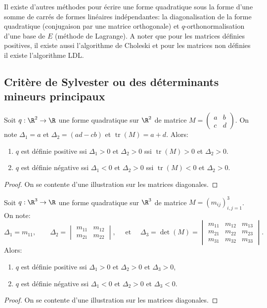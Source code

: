 \sld{\vfill\pagebreak[5]}%
\begin{remark}
	Il existe d'autres méthodes pour écrire une forme quadratique sous la forme d'une somme de carrés de formes linéaires indépendantes: la diagonalisation de la forme quadratique (conjugaison par une matrice orthogonale) et $q$-orthonormalisation d'une base de $E$ (méthode de Lagrange). A noter que pour les matrices définies positives, il existe aussi l'algorithme de Choleski et pour les matrices non définies il existe l'algorithme LDL.
\end{remark}

\sld{\vfill\pagebreak[5]}%
\subsection{Critère de Sylvester ou des déterminants mineurs principaux}


\begin{proposition}
	Soit $q: \R^2 \to \R$ une forme quadratique sur $\R^2$	de matrice $M = \begin{pmatrix}
		a & b \\ c & d
	\end{pmatrix}$. On note $\Delta_1 = a$ et $\Delta_2 =(ad - cb)$ et $\operatorname{tr}(M) = a +d$. Alors:
	\begin{enumerate}
		\item $q$ est définie positive ssi $\Delta_1>0$ et $ \Delta_2 >0$ ssi  $\operatorname{tr}(M) >0$ et $\Delta_2>0$.
		\item $q$ est définie négative ssi $\Delta_1<0$ et $ \Delta_2 >0$ ssi  $\operatorname{tr}(M) <0$ et $\Delta_2>0$.
	\end{enumerate}
\end{proposition}

\begin{proof}
 On se contente d'une illustration sur les matrices diagonales.
 \pl{\rep{4cm}}
\end{proof}

\sld{\vfill\pagebreak[5]}%
\begin{proposition}
	Soit $q: \R^3 \to \R$ une forme quadratique sur $\R^3$	de matrice $M = \left( m_{ij} \right)_{i,j=1}^3$. On note: 
	\[ 
		\Delta_1 = m_{11}, \qquad \Delta_2 = \begin{vmatrix}
		m_{11} & m_{12} \\ m_{21} & m_{22}
	\end{vmatrix}, \quad \text{ et }  \quad  \Delta_3 = \det(M) = \begin{vmatrix}
		m_{11} & m_{12} & m_{13} \\ m_{21} & m_{22} & m_{23} \\  m_{31} & m_{32} & m_{33}
\end{vmatrix}.
\]
Alors:
	\begin{enumerate}
		\item $q$ est définie positive ssi $\Delta_1>0$ et $\Delta_2>0 $ et $\Delta_3 >0$, 
		\item $q$ est définie négative ssi $\Delta_1 <0$ et $\Delta_2 >0 $ et $\Delta_3<0$.
	\end{enumerate}
\end{proposition}


\begin{proof}
 On se contente d'une illustration sur les matrices diagonales.
 \pl{\rep{4cm}}
\end{proof}
